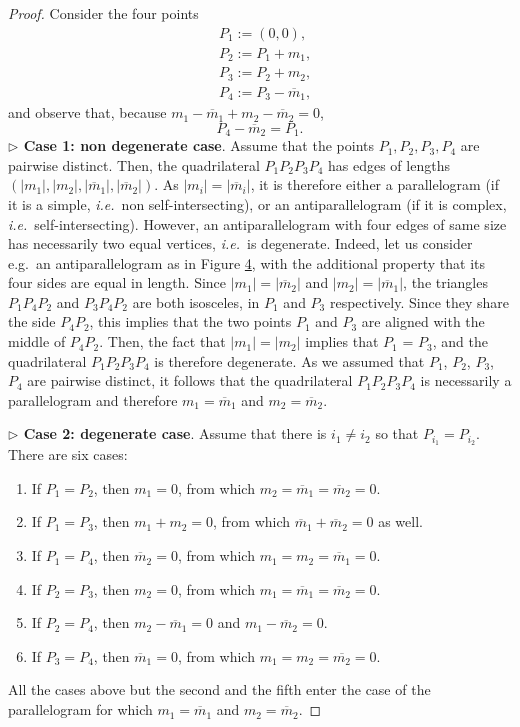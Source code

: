 \documentclass[a4paper,11pt]{amsart}
\numberwithin{equation}{section}
\theoremstyle{definition}
\begin{document}
\begin{proof}
Consider the four points
\begin{align*}
    &P_1 := (0,0), \\
    &P_2 := P_1 + m_1, \\
    &P_3 := P_2 + m_2, \\
    &P_4 := P_3 - \overline{m}_1, 
\end{align*}
and observe that, because $m_1 -\overline m_1+m_2 -  \overline m_2 = 0$,
$$
P_4 - \overline{m}_2 = P_1.
$$
\noindent\textbf{$\triangleright$ Case 1: non degenerate case}. Assume that the points $P_1, P_2, P_3, P_4$ are pairwise distinct. Then, the  quadrilateral $P_1P_2P_3P_4$ has edges of lengths $(|m_1|, |m_2|, |\overline{m}_1|, |\overline{m}_2|)$. As $|m_i| = |\overline m_i|$, it is therefore either a parallelogram (if it is a simple, \textit{i.e.}~non self-intersecting), or an antiparallelogram (if it is complex, \textit{i.e.}~self-intersecting). However, an antiparallelogram with four edges of same size has necessarily two equal vertices, \textit{i.e.}~is degenerate. Indeed, let us consider e.g.~an antiparallelogram as in Figure \hyperref[fig:antipara]{4}, with the additional property that its four sides are equal in length. Since $\vert m_1\vert = \vert\overline{m}_2\vert$ and $\vert m_2\vert = \vert\overline{m}_1\vert$, the triangles $P_1P_4P_2$ and $P_3P_4P_2$ are both isosceles, in $P_1$ and $P_3$ respectively. Since they share the side $P_4P_2$, this implies that the two points $P_1$ and $P_3$ are aligned with the middle of $P_4P_2$. Then, the fact that $\vert m_1\vert = \vert m_2\vert$ implies that $P_1$ = $P_3$, and the quadrilateral $P_1P_2P_3P_4$ is therefore degenerate. As we assumed that $P_1$, $P_2$, $P_3$, $P_4$ are pairwise distinct, it follows that the quadrilateral $P_1P_2P_3P_4$ is necessarily a parallelogram and therefore $m_1 = \overline{m}_1$ and  $m_2 = \overline{m}_2$.

\medskip

\noindent\textbf{$\triangleright$ Case 2: degenerate case}. Assume that there is $i_1\neq i_2$ so that $P_{i_1} = P_{i_2}$. There are six cases: 
\begin{enumerate}
    \item[1.] If  $P_1 = P_2$, then $m_1 = 0 $, from which $m_2 = \overline m_1 = \overline m_2 = 0$.
    \item[2.] If $P_1 = P_3$, then $m_1+m_2 = 0$, from which 
    $\overline m_1 + \overline m_2 = 0$ as well. 
    \item[3.] If  $P_1 = P_4$, then $\overline m_2 = 0$, from which $m_1 = m_2 = \overline m_1 = 0$.
    \item[4.] If  $P_2 = P_3$, then $m_2 = 0$, from which $m_1 = \overline m_1 = \overline m_2 = 0$.
    \item[5.] If  $P_2 = P_4$, then $m_2 - \overline m_1 = 0$ and $m_1 - \overline m_2 = 0$. 
    \item[6.] If $P_3=P_4$, then $\overline m_1 = 0$,  from which $m_1 = m_2 = \overline{m_2} = 0$.
\end{enumerate}
All the cases above but the second and the fifth enter the case of the parallelogram for which $m_1 = \overline{m}_1$ and $m_2 = \overline{m}_2$.
\end{proof}
\end{document}
